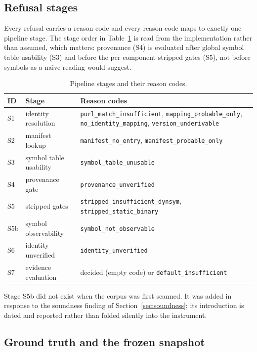 \subsection{Refusal stages}

Every refusal carries a reason code and every reason code maps to exactly one
pipeline stage. The stage order in Table~\ref{tab:stages} is read from the
implementation rather than assumed, which matters: provenance (S4) is evaluated
after global symbol table usability (S3) and before the per component stripped
gates (S5), not before symbols as a naive reading would suggest.

\begin{table}[t]
\caption{Pipeline stages and their reason codes.}
\label{tab:stages}
\centering
\footnotesize
\setlength{\tabcolsep}{3pt}
\begin{tabular}{@{}l>{\raggedright\arraybackslash}p{1.65cm}>{\raggedright\arraybackslash}p{4.15cm}@{}}
\toprule
ID & Stage & Reason codes \\
\midrule
S1 & identity resolution & \texttt{purl\_match\_\-insufficient}, \texttt{mapping\_\-probable\_only}, \texttt{no\_identity\_\-mapping}, \texttt{version\_\-underivable} \\
S2 & manifest lookup & \texttt{manifest\_no\_entry}, \texttt{manifest\_\-probable\_only} \\
S3 & symbol table usability & \texttt{symbol\_table\_\-unusable} \\
S4 & provenance gate & \texttt{provenance\_\-unverified} \\
S5 & stripped gates & \texttt{stripped\_\-insufficient\_dynsym}, \texttt{stripped\_\-static\_binary} \\
S5b & symbol observability & \texttt{symbol\_not\_\-observable} \\
S6 & identity unverified & \texttt{identity\_\-unverified} \\
S7 & evidence evaluation & decided (empty code) or \texttt{default\_\-insufficient} \\
\bottomrule
\end{tabular}
\end{table}

Stage S5b did not exist when the corpus was first scanned. It was added in
response to the soundness finding of Section~\ref{sec:soundness}; its
introduction is dated and reported rather than folded silently into the
instrument.

\subsection{Ground truth and the frozen snapshot}
\label{sec:frozen}

